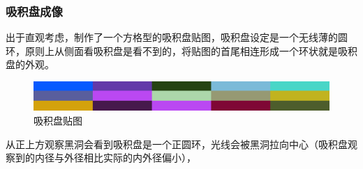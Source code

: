 \subsubsection{吸积盘成像}
出于直观考虑，制作了一个方格型的吸积盘贴图，吸积盘设定是一个无线薄的圆环，原则上从侧面看吸积盘是看不到的，将贴图的首尾相连形成一个环状就是吸积盘的外观。
\begin{figure}[H]
    \centering
    \includegraphics[scale=0.5]{images/flag.png}
    \caption{吸积盘贴图}
    \label{fig:disk-flag-texutre} %
\end{figure}
从正上方观察黑洞会看到吸积盘是一个正圆环，光线会被黑洞拉向中心（吸积盘观察到的内径与外径相比实际的内外径偏小），

